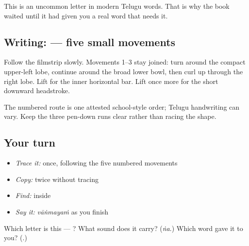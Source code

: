 This is an uncommon letter in modern Telugu words. That is why the book waited until it had given you a real word that needs it.

\subsection*{Writing:  — five small movements}

Follow the filmstrip slowly. Movements 1–3 stay joined: turn around the compact upper-left lobe, continue around the broad lower bowl, then curl up through the right lobe. Lift for the inner horizontal bar. Lift once more for the short downward headstroke.

The numbered route is one attested school-style order; Telugu handwriting can vary. Keep the three pen-down runs clear rather than racing the shape.

\subsection*{Your turn}
\begin{itemize}
\raggedright
  \item \emph{Trace it:} \textbf{} once, following the five numbered movements
  \item \emph{Copy:} \textbf{} twice without tracing
  \item \emph{Find:} \textbf{} inside \textbf{}
  \item \emph{Say it:} \emph{vāṅmayaṁ} as you finish
\end{itemize}

\begin{tcolorbox}[breakable,colback=teal!4,colframe=teal!35!black,title={Before you move on}]
Which letter is this — \textbf{}? What sound does it carry? (\emph{ṅa}.) Which word gave it to you? (\textbf{}.)
\end{tcolorbox}
